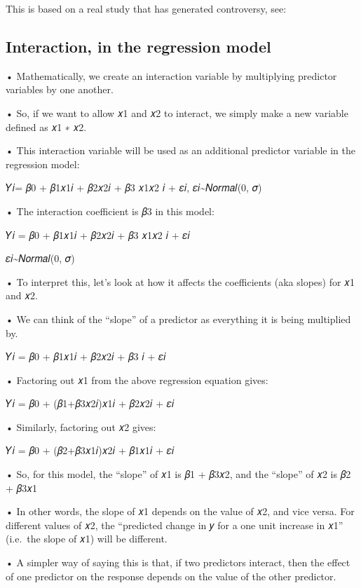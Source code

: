 \documentclass[
  letterpaper,
  DIV=11,
  numbers=noendperiod]{scrreprt}
\begin{document}
This is based on a real study that has generated controversy, see:
\href{https://statmodeling.stat.columbia.edu/2018/11/01/facial-feedback-findings-suggest-minute-differences-}{}

\hypertarget{interaction-in-the-regression-model}{%
\subsection{Interaction, in the regression
model}\label{interaction-in-the-regression-model}}

• Mathematically, we create an interaction variable by multiplying
predictor variables by one another.

• So, if we want to allow 𝑥1 and 𝑥2 to interact, we simply make a new
variable defined as 𝑥1 ∗ 𝑥2.

• This interaction variable will be used as an additional predictor
variable in the regression model:

𝑌𝑖= 𝛽0 + 𝛽1𝑥1𝑖 + 𝛽2𝑥2𝑖 + 𝛽3 𝑥1𝑥2 𝑖 + 𝜀𝑖, 𝜀𝑖\textasciitilde 𝑁𝑜𝑟𝑚𝑎𝑙(0, 𝜎)

• The interaction coefficient is 𝛽3 in this model:

𝑌𝑖 = 𝛽0 + 𝛽1𝑥1𝑖 + 𝛽2𝑥2𝑖 + 𝛽3 𝑥1𝑥2 𝑖 + 𝜀𝑖

𝜀𝑖\textasciitilde 𝑁𝑜𝑟𝑚𝑎𝑙(0, 𝜎)

• To interpret this, let's look at how it affects the coefficients (aka
slopes) for 𝑥1 and 𝑥2.

• We can think of the ``slope'' of a predictor as everything it is being
multiplied by.

𝑌𝑖 = 𝛽0 + 𝛽1𝑥1𝑖 + 𝛽2𝑥2𝑖 + 𝛽3 𝑖 + 𝜀𝑖

• Factoring out 𝑥1 from the above regression equation gives:

𝑌𝑖 = 𝛽0 + (𝛽1+𝛽3𝑥2𝑖)𝑥1𝑖 + 𝛽2𝑥2𝑖 + 𝜀𝑖

• Similarly, factoring out 𝑥2 gives:

𝑌𝑖 = 𝛽0 + (𝛽2+𝛽3𝑥1𝑖)𝑥2𝑖 + 𝛽1𝑥1𝑖 + 𝜀𝑖

• So, for this model, the ``slope'' of 𝑥1 is 𝛽1 + 𝛽3𝑥2, and the
``slope'' of 𝑥2 is 𝛽2 + 𝛽3𝑥1

• In other words, the slope of 𝑥1 depends on the value of 𝑥2, and vice
versa. For different values of 𝑥2, the ``predicted change in 𝑦 for a one
unit increase in 𝑥1'' (i.e.~the slope of 𝑥1) will be different.

• A simpler way of saying this is that, if two predictors interact, then
the effect of one predictor on the response depends on the value of the
other predictor.
\end{document}
